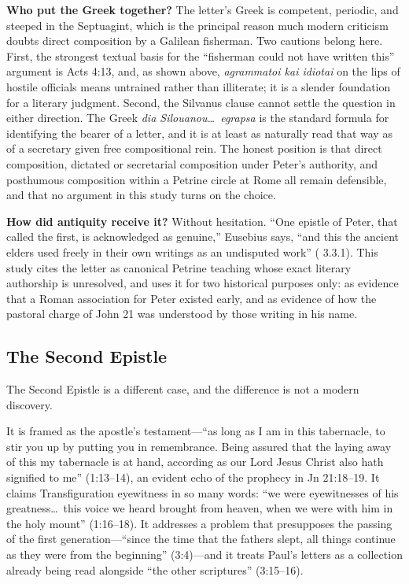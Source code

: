 \textbf{Who put the Greek together?} The letter's Greek is competent,
periodic, and steeped in the Septuagint, which is the principal reason much
modern criticism doubts direct composition by a Galilean fisherman. Two
cautions belong here. First, the strongest textual basis for the ``fisherman
could not have written this'' argument is Acts 4:13, and, as shown above,
\textit{agrammatoi kai idiotai} on the lips of hostile officials means
untrained rather than illiterate; it is a slender foundation for a
literary judgment. Second, the Silvanus clause cannot settle the question in
either direction. The Greek \textit{dia Silouanou\ldots\ egrapsa} is the
standard formula for identifying the bearer of a letter, and it is at least
as naturally read that way as of a secretary given free compositional rein.
The honest position is that direct composition, dictated or secretarial
composition under Peter's authority, and posthumous composition within a
Petrine circle at Rome all remain defensible, and that no argument in this
study turns on the choice.

\textbf{How did antiquity receive it?} Without hesitation. ``One epistle of
Peter, that called the first, is acknowledged as genuine,'' Eusebius says,
``and this the ancient elders used freely in their own writings as an
undisputed work'' ( 3.3.1). This study cites the letter
as canonical Petrine teaching whose exact literary authorship is unresolved,
and uses it for two historical purposes only: as evidence that a Roman
association for Peter existed early, and as evidence of how the pastoral
charge of John 21 was understood by those writing in his name.

\subsection{The Second Epistle}

The Second Epistle is a different case, and the difference is not a modern
discovery.

It is framed as the apostle's testament---``as long as I am in this
tabernacle, to stir you up by putting you in remembrance. Being assured that
the laying away of this my tabernacle is at hand, according as our Lord Jesus
Christ also hath signified to me'' (1:13--14), an evident echo of the
prophecy in Jn 21:18--19. It claims Transfiguration eyewitness in so many
words: ``we were eyewitnesses of his greatness\ldots\ this voice we heard
brought from heaven, when we were with him in the holy mount'' (1:16--18). It
addresses a problem that presupposes the passing of the first generation---``since the time that the fathers slept, all things continue as they were
from the beginning'' (3:4)---and it treats Paul's letters as a collection
already being read alongside ``the other scriptures'' (3:15--16).

